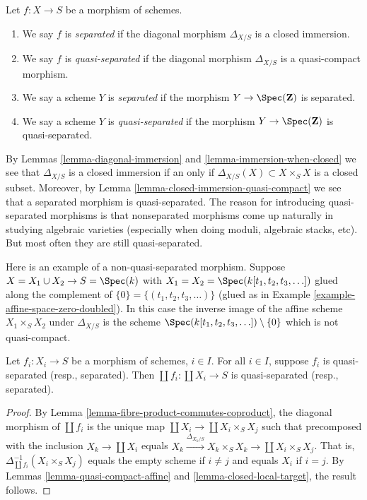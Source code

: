 \begin{definition}
\label{definition-separated}
Let $f : X \to S$ be a morphism of schemes.
\begin{enumerate}
\item We say $f$ is {\it separated} if the diagonal morphism $\Delta_{X/S}$
is a closed immersion.
\item We say $f$ is {\it quasi-separated} if the diagonal morphism
$\Delta_{X/S}$ is a quasi-compact morphism.
\item We say a scheme $Y$ is {\it separated} if the morphism
$Y \to \Spec(\mathbf{Z})$ is separated.
\item We say a scheme $Y$ is {\it quasi-separated} if the morphism
$Y \to \Spec(\mathbf{Z})$ is quasi-separated.
\end{enumerate}
\end{definition}

\noindent
By Lemmas \ref{lemma-diagonal-immersion} and \ref{lemma-immersion-when-closed}
we see that $\Delta_{X/S}$ is a closed immersion if an only if
$\Delta_{X/S}(X) \subset X \times_S X$ is a closed subset. Moreover,
by Lemma \ref{lemma-closed-immersion-quasi-compact} we see that a
separated morphism is quasi-separated. The reason for introducing
quasi-separated morphisms is that nonseparated morphisms come up naturally
in studying algebraic varieties (especially when doing moduli,
algebraic stacks, etc). But most often they are still quasi-separated.

\begin{example}
\label{example-not-quasi-separated}
Here is an example of a non-quasi-separated morphism.
Suppose $X = X_1 \cup X_2 \to S = \Spec(k)$ with
$X_1 = X_2 = \Spec(k[t_1, t_2, t_3, \ldots])$
glued along the complement of $\{0\} = \{(t_1, t_2, t_3, \ldots)\}$
(glued as in Example \ref{example-affine-space-zero-doubled}).
In this case the inverse image of the affine scheme
$X_1 \times_S X_2$ under $\Delta_{X/S}$ is the scheme
$\Spec(k[t_1, t_2, t_3, \ldots]) \setminus \{0\}$
which is not quasi-compact.
\end{example}

\begin{lemma}
	\label{lemma-quasi-separated-coproduct}
	Let $f_i:X_i\to S$ be a morphism of schemes, $i\in I$.
	For all $i\in I$, suppose $f_i$ is quasi-separated (resp., separated).
	Then $\coprod f_i:\coprod X_i\to S$ is quasi-separated (resp., separated).
\end{lemma}

\begin{proof}
	By Lemma \ref{lemma-fibre-product-commutes-coproduct}, the diagonal morphism of $\coprod f_i$ is the unique map $\coprod X_i\to\coprod X_i\times_S X_j$ such that precomposed with the inclusion $X_k\to\coprod X_i$ equals $X_k\xrightarrow{\Delta_{X_k/S}} X_k\times_S X_k\to \coprod X_i\times_S X_j$. That is, $\Delta_{\coprod f_i}^{-1}(X_i\times_S X_j)$ equals the empty scheme if $i\neq j$ and equals $X_i$ if $i=j$.
	By Lemmas \ref{lemma-quasi-compact-affine} and
	\ref{lemma-closed-local-target}, the result follows.
\end{proof}

